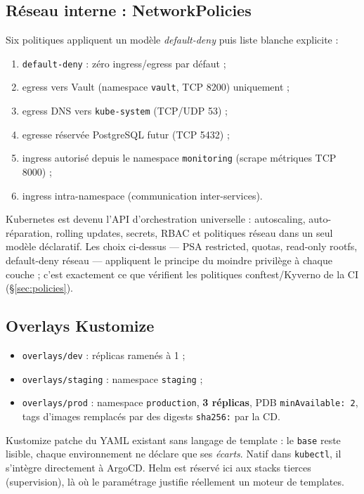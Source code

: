 \documentclass[11pt,a4paper]{article}
\begin{document}
\subsection{Réseau interne : NetworkPolicies}\label{sec:netpol}
Six politiques appliquent un modèle \emph{default-deny} puis liste blanche explicite :
\begin{enumerate}[itemsep=1pt]
  \item \texttt{default-deny} : zéro ingress/egress par défaut ;
  \item egress vers Vault (namespace \texttt{vault}, TCP 8200) uniquement ;
  \item egress DNS vers \texttt{kube-system} (TCP/UDP 53) ;
  \item egresse réservée PostgreSQL futur (TCP 5432) ;
  \item ingress autorisé depuis le namespace \texttt{monitoring} (scrape métriques TCP 8000) ;
  \item ingress intra-namespace (communication inter-services).
\end{enumerate}

\begin{whybox}
Kubernetes est devenu l'API d'orchestration universelle : autoscaling, auto-réparation, rolling updates, secrets, RBAC et politiques réseau dans un seul modèle déclaratif. Les choix ci-dessus --- PSA restricted, quotas, read-only rootfs, default-deny réseau --- appliquent le principe du moindre privilège à chaque couche ; c'est exactement ce que vérifient les politiques conftest/Kyverno de la CI (\S\ref{sec:policies}).
\end{whybox}

\subsection{Overlays Kustomize}
\begin{itemize}[itemsep=1pt]
  \item \texttt{overlays/dev} : réplicas ramenés à 1 ;
  \item \texttt{overlays/staging} : namespace \texttt{staging} ;
  \item \texttt{overlays/prod} : namespace \texttt{production}, \textbf{3 réplicas}, PDB \texttt{minAvailable: 2}, tags d'images remplacés par des digests \texttt{sha256:} par la CD.
\end{itemize}

\begin{whybox}
Kustomize patche du YAML existant sans langage de template : le \texttt{base} reste lisible, chaque environnement ne déclare que ses \emph{écarts}. Natif dans \texttt{kubectl}, il s'intègre directement à ArgoCD. Helm est réservé ici aux stacks tierces (supervision), là où le paramétrage justifie réellement un moteur de templates.
\end{whybox}
\end{document}

